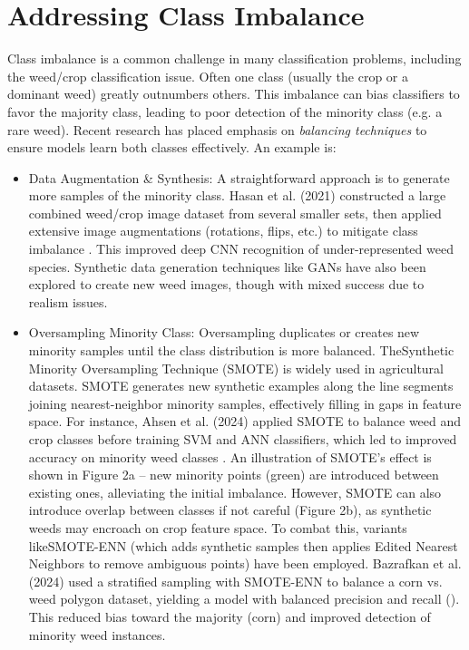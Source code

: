 \documentclass[letterpaper]{report}
\begin{document}
\section{Addressing Class Imbalance}  
Class imbalance is a common challenge in many classification problems, including the weed/crop classification issue. Often one class (usually the crop or a dominant weed) greatly outnumbers others. This imbalance can bias classifiers to favor the majority class, leading to poor detection of the minority class (e.g. a rare weed). Recent research \parencite{Wang2021-dh} has placed emphasis on \textit{balancing techniques} to ensure models learn both classes effectively. An example is:  

\begin{itemize}
	\item{Data Augmentation \& Synthesis: A straightforward approach is to generate more samples of the minority class. Hasan et al. (2021) constructed a large combined weed/crop image dataset from several smaller sets, then applied extensive image augmentations (rotations, flips, etc.) to mitigate class imbalance \parencite{Mahmudul-Hasan2023-ap}. This improved deep CNN recognition of under-represented weed species. Synthetic data generation techniques like GANs have also been explored to create new weed images, though with mixed success due to realism issues. } 

	\item{Oversampling Minority Class: Oversampling duplicates or creates new minority samples until the class distribution is more balanced. TheSynthetic Minority Oversampling Technique (SMOTE) is widely used  in agricultural datasets. SMOTE generates new synthetic examples along the line segments joining nearest-neighbor minority samples, effectively filling in gaps in feature space. For instance, Ahsen et al. (2024) applied SMOTE to balance weed and crop classes before training SVM and ANN classifiers, which led to improved accuracy on minority weed classes \parencite{Ahsen2024-dm}. An illustration of SMOTE’s effect is shown in Figure 2a – new minority points (green) are introduced between existing ones, alleviating the initial imbalance. However, SMOTE can also introduce overlap between classes if not careful (Figure 2b), as synthetic weeds may encroach on crop feature space. To combat this, variants likeSMOTE-ENN (which adds synthetic samples then applies Edited Nearest Neighbors to remove ambiguous points) have been employed. Bazrafkan et al. (2024) used a stratified sampling with SMOTE-ENN to balance a corn vs. weed polygon dataset, yielding a model with balanced precision and recall (\parencite{Bazrafkan2024-bl}). This reduced bias toward the majority (corn) and improved detection of minority weed instances.  }


\end{itemize}
\end{document}
